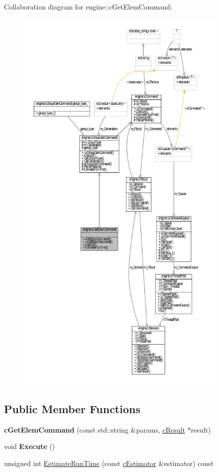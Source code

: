 \-Collaboration diagram for engine\-:\-:c\-Get\-Elem\-Command\-:\nopagebreak
\begin{figure}[H]
\begin{center}
\leavevmode
\includegraphics[height=550pt]{classengine_1_1cGetElemCommand__coll__graph}
\end{center}
\end{figure}
\subsection*{\-Public \-Member \-Functions}
\begin{DoxyCompactItemize}
\item 
\hypertarget{classengine_1_1cGetElemCommand_ae65189d2ef82b1ca49295268846b1dd6}{{\bfseries c\-Get\-Elem\-Command} (const std\-::string \&params, \hyperlink{classengine_1_1cResult}{c\-Result} $\ast$result)}\label{classengine_1_1cGetElemCommand_ae65189d2ef82b1ca49295268846b1dd6}

\item 
\hypertarget{classengine_1_1cGetElemCommand_a16a627c20d55b3f2538bab7f63a04a04}{void {\bfseries \-Execute} ()}\label{classengine_1_1cGetElemCommand_a16a627c20d55b3f2538bab7f63a04a04}

\item 
unsigned int \hyperlink{classengine_1_1cGetElemCommand_ad84c73fe5b4db65679f28c427d201434}{\-Estimate\-Run\-Time} (const \hyperlink{classengine_1_1cEstimator}{c\-Estimator} \&estimator) const 
\end{DoxyCompactItemize}


